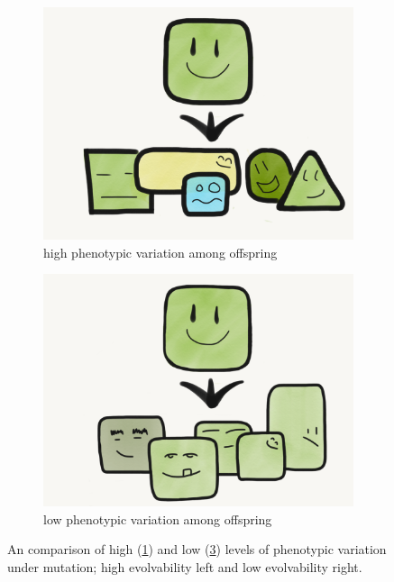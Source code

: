 
\begin{figure}
 \centering
    \begin{subfigure}[b]{0.5\textwidth}
        \centering
    	\includegraphics[width=\textwidth]{img/individual_evolvability}
        \caption{high phenotypic variation among offspring}
        \label{fig:high}
    \end{subfigure}%
    \hfill
    \begin{subfigure}[b]{0.5\textwidth}
        \centering
        \includegraphics[width=\textwidth]{img/low_individual_evolvability}
        \caption{low phenotypic variation among offspring}
        \label{fig:low}
    \end{subfigure}
    \vspace{-4ex}
  \caption{An comparison of high (\ref{fig:high}) and low (\ref{fig:low}) levels of phenotypic variation under mutation; high evolvability left and low evolvability right.}
\end{figure}

